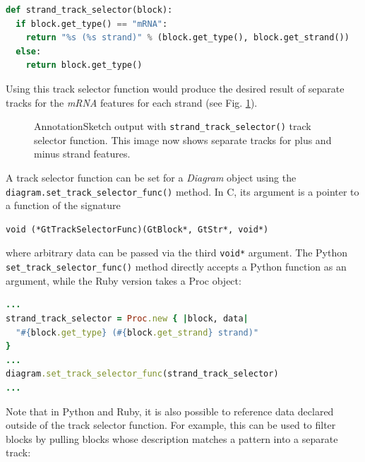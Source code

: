 \documentclass[a4paper]{scrreprt}
\begin{document}
\begin{lstlisting}[language=Python, showstringspaces=false,numbers=none,frame=single]
def strand_track_selector(block):
  if block.get_type() == "mRNA":
    return "%s (%s strand)" % (block.get_type(), block.get_strand())
  else:
    return block.get_type()
\end{lstlisting}

Using this track selector function would produce the desired result of separate tracks for the \emph{mRNA} features for each strand (see Fig. \ref{tsexample2}).

\begin{figure}[ht]
\caption{AnnotationSketch output with \texttt{strand\_track\_se\-lector()} track selector function. This image now shows separate tracks for plus and minus strand features.}
\label{tsexample2}
\end{figure}

A track selector function can be set for a \emph{Diagram} object using the \texttt{diagram.set\_track\_se\-lec\-tor\_func()} method. In C, its argument is a pointer to a function of the signature
\medskip
\begin{verbatim}
void (*GtTrackSelectorFunc)(GtBlock*, GtStr*, void*)
\end{verbatim}
\medskip
where arbitrary data can be passed via the third \texttt{void*} argument. The Python \texttt{set\_track\_se\-lec\-tor\_func()} method directly accepts a Python function as an argument, while the Ruby version takes a Proc object:

\begin{lstlisting}[language=Ruby, showstringspaces=false,numbers=none,frame=single]
...
strand_track_selector = Proc.new { |block, data|
  "#{block.get_type} (#{block.get_strand} strand)"
}
...
diagram.set_track_selector_func(strand_track_selector)
...
\end{lstlisting}

Note that in Python and Ruby, it is also possible to reference data declared outside of the track selector function. For example, this can be used to filter blocks by pulling blocks whose description matches a pattern into a separate track:
\end{document}
